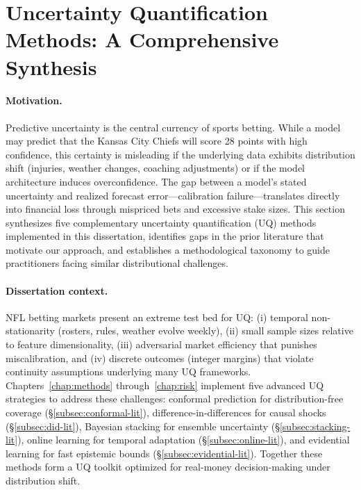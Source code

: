 
\section{Uncertainty Quantification Methods: A Comprehensive Synthesis}
\label{sec:uq-synthesis}

\paragraph{Motivation.}
Predictive uncertainty is the central currency of sports betting. While a model may predict that the Kansas City Chiefs will score 28 points with high confidence, this certainty is misleading if the underlying data exhibits distribution shift (injuries, weather changes, coaching adjustments) or if the model architecture induces overconfidence. The gap between a model's stated uncertainty and realized forecast error---calibration failure---translates directly into financial loss through mispriced bets and excessive stake sizes. This section synthesizes five complementary uncertainty quantification (UQ) methods implemented in this dissertation, identifies gaps in the prior literature that motivate our approach, and establishes a methodological taxonomy to guide practitioners facing similar distributional challenges.

\paragraph{Dissertation context.}
NFL betting markets present an extreme test bed for UQ: (i) temporal non-stationarity (rosters, rules, weather evolve weekly), (ii) small sample sizes relative to feature dimensionality, (iii) adversarial market efficiency that punishes miscalibration, and (iv) discrete outcomes (integer margins) that violate continuity assumptions underlying many UQ frameworks. Chapters~\ref{chap:methods} through~\ref{chap:risk} implement five advanced UQ strategies to address these challenges: conformal prediction for distribution-free coverage (\S\ref{subsec:conformal-lit}), difference-in-differences for causal shocks (\S\ref{subsec:did-lit}), Bayesian stacking for ensemble uncertainty (\S\ref{subsec:stacking-lit}), online learning for temporal adaptation (\S\ref{subsec:online-lit}), and evidential learning for fast epistemic bounds (\S\ref{subsec:evidential-lit}). Together these methods form a UQ toolkit optimized for real-money decision-making under distribution shift.

